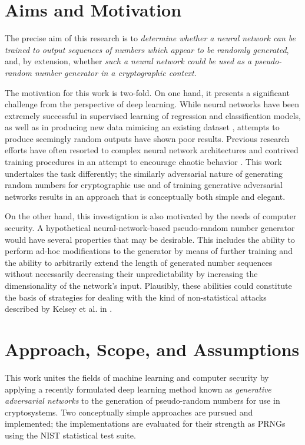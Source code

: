 \documentclass[12pt, titlepage]{report}
\theoremstyle{definition}
\begin{document}
\section{Aims and Motivation}\label{subsection:aims}
The precise aim of this research is to \emph{determine whether a neural network can be trained to output sequences of numbers which appear to be randomly generated}, and, by extension, whether \emph{such a neural network could be used as a pseudo-random number generator in a cryptographic context}. 

The motivation for this work is two-fold. On one hand, it presents a significant challenge from the perspective of deep learning. While neural networks have been extremely successful in supervised learning of regression and classification models, as well as in producing new data mimicing an existing dataset \cite{goodfellow2014generative}, attempts to produce seemingly random outputs have shown poor results. Previous research efforts have often resorted to complex neural network architectures and contrived training procedures in an attempt to encourage chaotic behavior \cite{desai2011pseudo} \cite{desai2012pseudo} \cite{tirdad2010hopfield}. This work undertakes the task differently; the similarly adversarial nature of generating random numbers for cryptographic use and of training generative adversarial networks results in an approach that is conceptually both simple and elegant.

On the other hand, this investigation is also motivated by the needs of computer security. A hypothetical neural-network-based pseudo-random number generator would have several properties that may be desirable. This includes the ability to perform ad-hoc modifications to the generator by means of further training and the ability to arbitrarily extend the length of generated number sequences without necessarily decreasing their unpredictability by increasing the dimensionality of the network's input. Plausibly, these abilities could constitute the basis of strategies for dealing with the kind of non-statistical attacks described by Kelsey et al. in \cite{kelsey1998cryptanalytic}.


\section{Approach, Scope, and Assumptions}
This work unites the fields of machine learning and computer security by applying a recently formulated deep learning method known as \emph{generative adversarial networks} \cite{goodfellow2014generative} to the generation of pseudo-random numbers for use in cryptosystems. Two conceptually simple approaches are pursued and implemented; the implementations are evaluated for their strength as PRNGs using the NIST statistical test suite.
\end{document}
